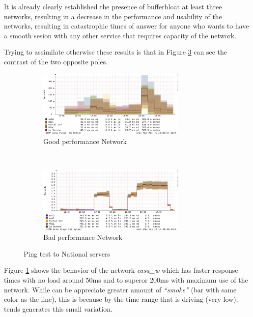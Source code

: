 It is already clearly established the presence of bufferbloat at least three
networks, resulting in a decrease in the performance and usability of the
networks, resulting in catastrophic times of answer for anyone who wants to
have a smooth sesion with any other service that requires capacity of the
network.

Trying to assimilate otherwise these results is that in Figure
\ref{fig:smokenat} can see the contrast of the two opposite poles.

\begin{figure}
\begin{subfigure}{\textwidth}
  \centering
    \includegraphics[width=0.8\textwidth]{img/smoke_nat_good}
\caption[Smokeping: Ping test to National servers with good performance]{Good performance Network}
\label{fig:smokenatgood}
\end{subfigure}%
\\
\begin{subfigure}{\textwidth}
\centering
    \includegraphics[width=0.8\textwidth]{img/smoke_nat_bad}
\caption[Smokeping: Ping test to National servers with bad performance]{Bad performance Network}
\label{fig:smokenatbad}
\end{subfigure}
\caption[Smokeping: Ping test to National servers]{Ping test to National servers}
\label{fig:smokenat}
\end{figure}

Figure \ref{fig:smokenatgood} shows the behavior of the network
\textit{casa\_w} which has faster response times with  no load around 50ms and
to superor  200ms with maximum use of the network. While can be appreciate
greater amount of \textit{``smoke''} (bar with same color as the line), this
is because by the time range that is driving (very low), tends generates this
small variation.

